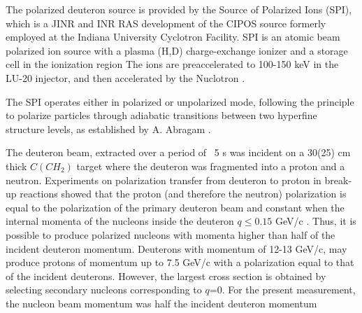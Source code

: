 \documentclass[epj]{svjour}
\begin{document}
The polarized deuteron source is provided by the Source of Polarized Ions (SPI), which is a JINR and INR RAS development of the CIPOS source \cite{Agapov:2004uu} formerly employed at the Indiana University Cyclotron Facility. SPI is an atomic beam polarized ion source with a plasma (H,D) charge-exchange ionizer and a storage cell in the ionization region
The ions are  preaccelerated to 100-150 keV in the LU-20 injector, and then accelerated by the Nuclotron \cite{Fimushkin:2016uu}. 

The SPI operates either in polarized or unpolarized mode, following the principle to polarize particles through adiabatic transitions between two hyperfine structure levels, as established by A. Abragam \cite{abragam1961}. 




The deuteron beam, extracted over a period of ~5 s was incident on a 30(25) cm thick $C(CH_2)$ target  where the deuteron was fragmented into a proton and a neutron. Experiments on polarization transfer from deuteron to proton in break-up reactions showed that the proton (and therefore the neutron) polarization is equal to the polarization of the primary deuteron beam and constant when the internal momenta of the nucleons inside the deuteron $q\le 0.15$ GeV/c \cite{Kuehn:1995hy}. Thus, it is possible to produce polarized nucleons with momenta higher than half of the incident deuteron momentum. Deuterons with momentum of 12-13 GeV/c, may produce protons of momentum up to 7.5 GeV/c with a polarization equal to that of the incident deuterons. However, the largest cross section is obtained by selecting secondary nucleons corresponding to  $q$=0. For the present measurement, the nucleon beam momentum was half the incident deuteron momentum
\end{document}
